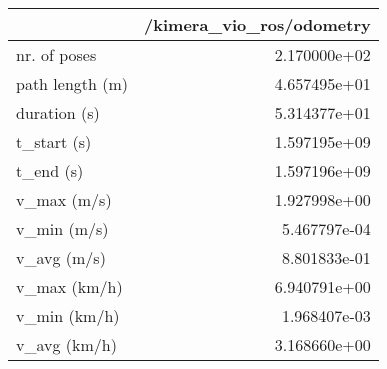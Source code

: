 \begin{tabular}{lr}
\toprule
{} &  /kimera\_vio\_ros/odometry \\
\midrule
nr. of poses    &              2.170000e+02 \\
path length (m) &              4.657495e+01 \\
duration (s)    &              5.314377e+01 \\
t\_start (s)     &              1.597195e+09 \\
t\_end (s)       &              1.597196e+09 \\
v\_max (m/s)     &              1.927998e+00 \\
v\_min (m/s)     &              5.467797e-04 \\
v\_avg (m/s)     &              8.801833e-01 \\
v\_max (km/h)    &              6.940791e+00 \\
v\_min (km/h)    &              1.968407e-03 \\
v\_avg (km/h)    &              3.168660e+00 \\
\bottomrule
\end{tabular}
